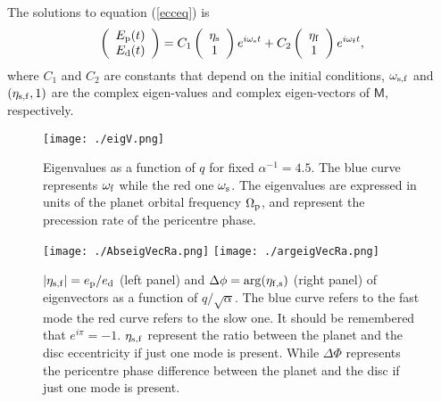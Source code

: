 \documentclass[usenatbib,a4paper,times,fleqn]{mnras}
\begin{document}
The solutions to equation (\ref{ecceq}) is
\begin{equation}
   \left(\begin{array}{c}
   E_{\rm p}(t)\\
   E_{\rm d}(t)
   \end{array}\right)=C_1\left(\begin{array}{c}
 \eta_{\rm s}\\
 1 
\end{array}\right)e^{i\omega_{\rm s}t}+C_2\left(\begin{array}{c}
 \eta_{\rm f}\\
 1 
\end{array}
\right) e^{i\omega_{\rm f}t},\label{generalsolution1}
\end{equation}
where $C_1$ and $C_2$ are constants that depend on the initial conditions, $\omega_{\rm s,f}$ and $(\eta_{\rm s,f},1)$ are the complex eigen-values and complex eigen-vectors of $\bm{\mathsf{M}}$, respectively.


\begin{figure}
\begin{center}
\texttt{[image: ./eigV.png]}
\caption{Eigenvalues as a function of $q$ for fixed $\alpha^{-1}=4.5$. The blue curve represents $\omega_{\rm f}$ while the red one $\omega_{\rm s}$. The eigenvalues are expressed in units of the planet orbital frequency $\Omega_{\rm p}$, and represent the precession rate of the pericentre phase. }
\label{fig:eigv}
\end{center}
\end{figure}

\begin{figure*}
\begin{center}
\texttt{[image: ./AbseigVecRa.png]}
\texttt{[image: ./argeigVecRa.png]}
\caption{$|\eta_{\rm s,f}|=e_{\rm p}/e_{\rm d}$ (left panel) and $\Delta\phi=\arg(\eta_{\rm f,s})$ (right panel) of eigenvectors as a function of $q/\sqrt{ \alpha}$. The blue curve refers to the fast mode the red curve refers to the slow one. It should be remembered that $e^{i\pi}=-1$. $\eta_{\rm s,f}$ represent the ratio between the planet and the disc eccentricity if just one mode is present. While $\Delta \Phi$ represents the pericentre phase difference between the planet and the disc if just one mode is present.}
\label{fig:eigvec}
\end{center}
\end{figure*}
\end{document}
